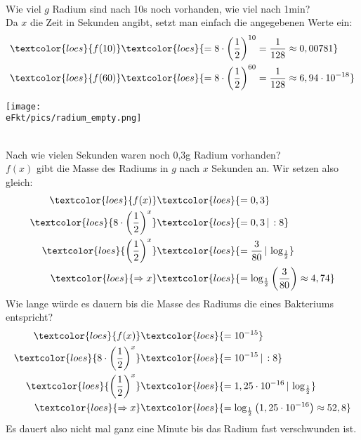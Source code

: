 \begin{minipage}{0.39\textwidth}
	\vspace{0.3cm}\\
	Wie viel \(g\) Radium sind nach 10s noch vorhanden, wie viel nach 1min?\\
	\textcolor{loes}{Da \(x\) die Zeit in Sekunden angibt, setzt man einfach die angegebenen Werte ein:}
	\begin{align*}
		\textcolor{loes}{f(10)}&\textcolor{loes}{=8\cdot \left(\frac{1}{2}\right)^{10}=\frac{1}{128}\approx 0,00781}\\
		\textcolor{loes}{f(60)}&\textcolor{loes}{=8\cdot \left(\frac{1}{2}\right)^{60}=\frac{1}{128}\approx 6,94\cdot10^{-18}}
	\end{align*}
	\vfill
\end{minipage}
\begin{minipage}{0.6\textwidth}\centering
	\texttt{[image: \\eFkt/pics/radium\_empty.png]}
\end{minipage}\vspace{0.3cm}\\
Nach wie vielen Sekunden waren noch 0,3g Radium vorhanden?\\
\textcolor{loes}{\(f(x)\) gibt die Masse des Radiums in \(g\) nach \(x\) Sekunden an. Wir setzen also gleich:}
\begin{align*}
	\textcolor{loes}{f(x)}&\textcolor{loes}{=0,3}\\
	\textcolor{loes}{8\cdot \left(\frac{1}{2}\right)^x}&\textcolor{loes}{=0,3\,|\,:8}\\
	\textcolor{loes}{\left(\frac{1}{2}\right)^x}&\textcolor{loes}{=\frac{3}{80}\,|\,\log_{\frac{1}{2}}}\\
	\textcolor{loes}{\Rightarrow x}&\textcolor{loes}{=\log_{\frac{1}{2}}\left(\frac{3}{80}\right) \approx 4,74}
\end{align*}
Wie lange würde es dauern bis die Masse des Radiums die eines Bakteriums entspricht?
\begin{align*}
	\textcolor{loes}{f(x)}&\textcolor{loes}{=10^{-15}}\\
	\textcolor{loes}{8\cdot \left(\frac{1}{2}\right)^x}&\textcolor{loes}{=10^{-15}\,|\,:8}\\
	\textcolor{loes}{\left(\frac{1}{2}\right)^x}&\textcolor{loes}{=1,25\cdot 10^{-16}\,|\,\log_{\frac{1}{2}}}\\
	\textcolor{loes}{\Rightarrow x}&\textcolor{loes}{=\log_{\frac{1}{2}}\left(1,25\cdot 10^{-16}\right) \approx 52,8}
\end{align*}
\textcolor{loes}{Es dauert also nicht mal ganz eine Minute bis das Radium fast verschwunden ist.}